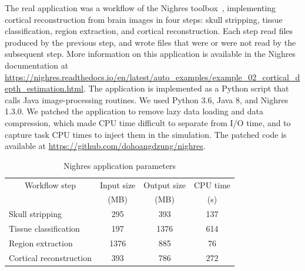 The real application was a workflow of the Nighres
toolbox~\cite{huntenburg2018nighres}, implementing cortical
reconstruction from brain images in four steps: skull stripping,
tissue classification, region extraction, and cortical
reconstruction. Each step read files produced by the previous step,
and wrote files that were or were not read by the subsequent step.
More information on this application is available in the Nighres
documentation at
\url{https://nighres.readthedocs.io/en/latest/auto_examples/example_02_cortical_depth_estimation.html}.
The application is implemented as a Python script that calls Java
image-processing routines. We used Python 3.6, Java 8, and Nighres
1.3.0. We patched the application to remove lazy data loading and
data compression, which made CPU time difficult to separate from
I/O time, and to capture task CPU times to inject them in the
simulation. The patched code is available at
\url{https://github.com/dohoangdzung/nighres}.
\begin{table}[t]
    \centering
    \begin{tabular}{lccc}
    \toprule
        \multicolumn{1}{c}{Workflow step}& Input size       & Output size      & CPU time\\
                               & (MB)             & (MB)             & (s)\\
    \midrule
       Skull stripping         &  295             & 393               & 137 \\
       Tissue classification   &  197              & 1376              & 614 \\
       Region extraction       &  1376             & 885              & 76 \\
       Cortical reconstruction &  393              & 786              & 272\\
    \bottomrule
    \end{tabular} 
    \caption{Nighres application parameters}
    \label{table:nighres_stats}
    \end{table}
